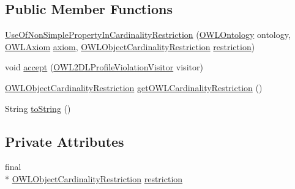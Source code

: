 \subsection*{Public Member Functions}
\begin{DoxyCompactItemize}
\item 
\hyperlink{classorg_1_1semanticweb_1_1owlapi_1_1profiles_1_1_use_of_non_simple_property_in_cardinality_restriction_af7472884b36e8c0c2ac938ab63863ec4}{Use\-Of\-Non\-Simple\-Property\-In\-Cardinality\-Restriction} (\hyperlink{interfaceorg_1_1semanticweb_1_1owlapi_1_1model_1_1_o_w_l_ontology}{O\-W\-L\-Ontology} ontology, \hyperlink{interfaceorg_1_1semanticweb_1_1owlapi_1_1model_1_1_o_w_l_axiom}{O\-W\-L\-Axiom} \hyperlink{classorg_1_1semanticweb_1_1owlapi_1_1profiles_1_1_o_w_l_profile_violation_aa7c8e8910ed3966f64a2c003fb516214}{axiom}, \hyperlink{interfaceorg_1_1semanticweb_1_1owlapi_1_1model_1_1_o_w_l_object_cardinality_restriction}{O\-W\-L\-Object\-Cardinality\-Restriction} \hyperlink{classorg_1_1semanticweb_1_1owlapi_1_1profiles_1_1_use_of_non_simple_property_in_cardinality_restriction_a52424aeca4daf3a360ac1eb19450925f}{restriction})
\item 
void \hyperlink{classorg_1_1semanticweb_1_1owlapi_1_1profiles_1_1_use_of_non_simple_property_in_cardinality_restriction_af9504f971cb045b9a8b1e507f461afff}{accept} (\hyperlink{interfaceorg_1_1semanticweb_1_1owlapi_1_1profiles_1_1_o_w_l2_d_l_profile_violation_visitor}{O\-W\-L2\-D\-L\-Profile\-Violation\-Visitor} visitor)
\item 
\hyperlink{interfaceorg_1_1semanticweb_1_1owlapi_1_1model_1_1_o_w_l_object_cardinality_restriction}{O\-W\-L\-Object\-Cardinality\-Restriction} \hyperlink{classorg_1_1semanticweb_1_1owlapi_1_1profiles_1_1_use_of_non_simple_property_in_cardinality_restriction_a3e095fff00a24ab9e2c898c9c6b70a5c}{get\-O\-W\-L\-Cardinality\-Restriction} ()
\item 
String \hyperlink{classorg_1_1semanticweb_1_1owlapi_1_1profiles_1_1_use_of_non_simple_property_in_cardinality_restriction_acfcbc31c247ad0a80c538e1d6bcad75e}{to\-String} ()
\end{DoxyCompactItemize}
\subsection*{Private Attributes}
\begin{DoxyCompactItemize}
\item 
final \\*
\hyperlink{interfaceorg_1_1semanticweb_1_1owlapi_1_1model_1_1_o_w_l_object_cardinality_restriction}{O\-W\-L\-Object\-Cardinality\-Restriction} \hyperlink{classorg_1_1semanticweb_1_1owlapi_1_1profiles_1_1_use_of_non_simple_property_in_cardinality_restriction_a52424aeca4daf3a360ac1eb19450925f}{restriction}
\end{DoxyCompactItemize}


